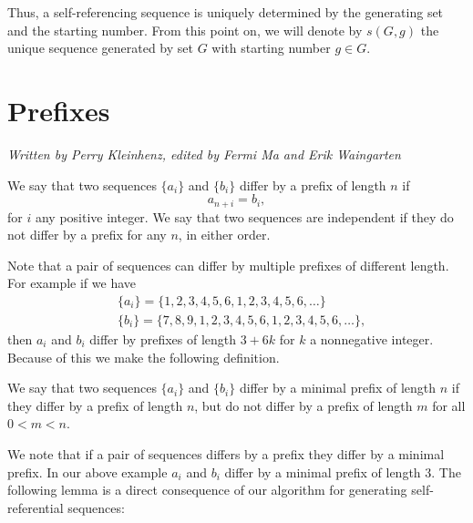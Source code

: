 \documentclass[runningheads,a4paper]{llncs}
\begin{document}
Thus, a self-referencing sequence is uniquely determined by the generating set and the starting number. From this point on, we will denote by $s(G,g)$ the unique sequence generated by set $G$ with starting number $g \in G$.

\section{Prefixes}
\label{prefixes}
\emph{Written by Perry Kleinhenz, edited by Fermi Ma and Erik Waingarten}
\begin{definition} We say that two sequences $\{a_i\}$ and $\{b_i\}$ differ by a prefix of length $n$ if 
\begin{equation*}
a_{n+i} = b_{i},
\end{equation*}
for $i$ any positive integer. We say that two sequences are independent if they do not differ by a prefix for any $n$, in either order. 
\end{definition}
Note that a pair of sequences can differ by multiple prefixes of different length. For example if we have 
\begin{align*}
&\{a_i\} = \{1,2,3,4,5,6,1,2,3,4,5,6, \ldots \} \\  
&\{b_i\}= \{7,8,9,1,2,3,4,5,6,1,2,3,4,5,6, \ldots\},
\end{align*}
 then $a_i$ and $b_i$ differ by prefixes of length $3+6k$ for $k$ a nonnegative integer. Because of this we make the following definition.
 \begin{definition} 
 We say that two sequences $\{a_i\}$ and $\{b_i\}$ differ by a minimal prefix of length $n$ if they differ by a prefix of length $n$, but do not differ by a prefix of length $m$ for all $0<m<n$.
 \end{definition}
We note that if a pair of sequences differs by a prefix they differ by a minimal prefix. In our above example $a_i$ and $b_i$ differ by a minimal prefix of length $3$. The following lemma is a direct consequence of our algorithm for generating self-referential sequences:
\end{document}
